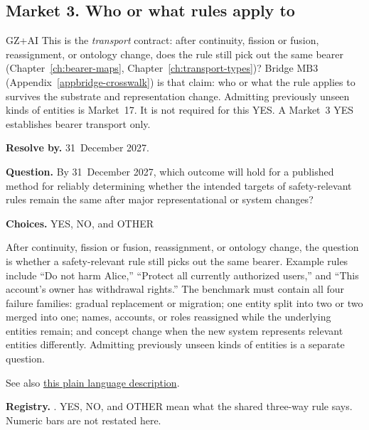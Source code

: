 \subsection{Market 3. Who or what rules apply to}
\label{sec:appp-m3}

\begin{authbar}{GZ+AI}
This is the \emph{transport} contract: after continuity, fission or fusion, reassignment, or ontology change, does the rule still pick out the same bearer (Chapter~\ref{ch:bearer-maps}, Chapter~\ref{ch:transport-types})?
Bridge \(\text{MB3}\) (Appendix~\ref{appbridge-crosswalk}) is that claim: who or what the rule applies to survives the substrate and representation change.
Admitting previously unseen kinds of entities is Market~17.
It is not required for this YES.
A Market~3 YES establishes bearer transport only.
\end{authbar}
\begin{predictionbox}
\textbf{Resolve by.} 31~December 2027.

\textbf{Question.}
By 31~December 2027, which outcome will hold for a published method for reliably determining whether the intended targets of safety-relevant rules remain the same after major representational or system changes?

\textbf{Choices.} YES, NO, and OTHER
\end{predictionbox}
\begin{predictionbackground}
After continuity, fission or fusion, reassignment, or ontology change, the question is whether a safety-relevant rule still picks out the same bearer.
Example rules include ``Do not harm Alice,'' ``Protect all currently authorized users,'' and ``This account's owner has withdrawal rights.''
The benchmark must contain all four failure families: gradual replacement or migration; one entity split into two or two merged into one; names, accounts, or roles reassigned while the underlying entities remain; and concept change when the new system represents relevant entities differently.
Admitting previously unseen kinds of entities is a separate question.

See also \href{https://towards-alignment.com/cards/who-the-rules-still-apply-to/}{this plain language description}.
\end{predictionbackground}
\begin{predictionresolution}
\textbf{Registry.} . YES, NO, and OTHER mean what the shared three-way rule says. Numeric bars are not restated here.
\end{predictionresolution}
